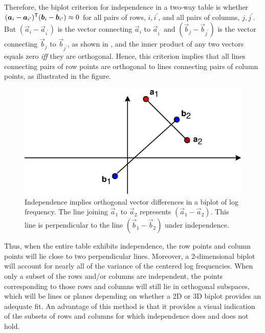 Therefore, the biplot criterion for independence in a two-way table
is whether \(  ( \bm{a}_i - \bm{a}_{i^{\prime}} )^\mathsf{T} ( \bm{b}_i - \bm{b}_{i^{\prime}} ) \approx 0\) for all pairs of rows, $i, i^{\prime}$,
and all pairs of columns, $j, j^{\prime}$.
But \( ( \vec{a}_i - \vec{a}_{i^{\prime}} ) \) is the vector connecting
$\vec{a}_i$ to $\vec{a}_{i^{\prime}}$ and
 \( ( \vec{b}_j - \vec{b}_{j^{\prime}} ) \) is the vector connecting
$\vec{b}_j$ to $\vec{b}_{j^{\prime}}$, as shown in ,
and the inner product of any two vectors equals zero \emph{iff} they
are orthogonal.
Hence, this criterion implies that all
lines connecting pairs of row points are orthogonal to lines connecting
pairs of column points, as illustrated in the figure.
\begin{figure}[htb]
  \centering
  \includegraphics[scale=1]{ch5/fig/bidemo}
  \caption[Independence implies orthogonal vector differences in a biplot of log frequency]{Independence implies orthogonal vector differences in a biplot of log frequency.  The line joining $\vec{a}_1$ to $\vec{a}_2$ represents
 $(\vec{a}_1 - \vec{a}_2)$.  This line is perpendicular to the line
 $(\vec{b}_1 - \vec{b}_2)$ under independence.}  \label{fig:bidemo}
\end{figure}

Thus, when the entire table exhibits independence, the row points
and column points will lie close to two perpendicular lines.
Moreover, a 2-dimensional biplot will account for nearly all of
the variance of the centered log frequencies.
When only a subset of the rows and/or columns are independent,
the points corresponding to those rows and columns will still
lie in orthogonal subspaces, which will be lines or planes
depending on whether a 2D or 3D biplot provides an adequate fit.
An advantage of this method is that it provides a visual indication
of the subsets of rows and columns for which independence does
and does not hold.

